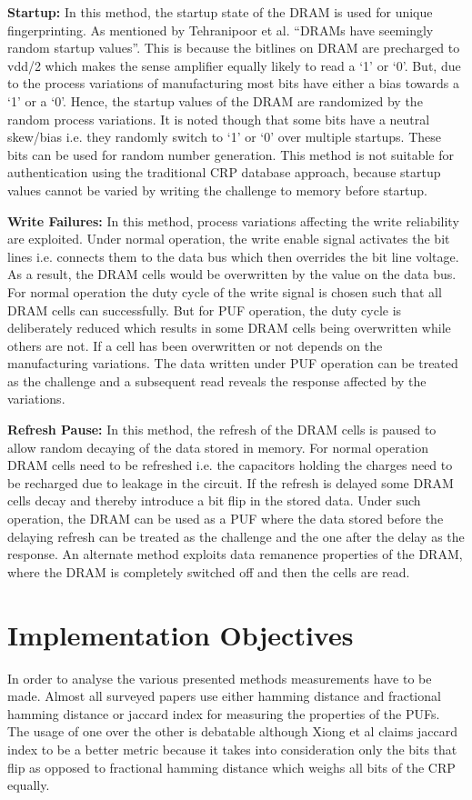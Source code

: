 \documentclass[journal, a4paper]{IEEEtran}
\begin{document}
\textbf{Startup:} In this method, the startup state of the DRAM is used for unique fingerprinting. As mentioned by Tehranipoor et al. “DRAMs have seemingly random startup values”. This is because the bitlines on DRAM are precharged to vdd/2 which makes the sense amplifier equally likely to read a ‘1’ or ‘0’. But, due to the process variations of manufacturing most bits have either a bias towards a ‘1’ or a ‘0’. Hence, the startup values of the DRAM are randomized by the random process variations. It is noted though that some bits have a neutral skew/bias i.e. they randomly switch to ‘1’ or ‘0’ over multiple startups. These bits can be used for random number generation. This method is not suitable for authentication using the traditional CRP database approach, because startup values cannot be varied by writing the challenge to memory before startup.\cite{TEH15}

\textbf{Write Failures:} In this method, process variations affecting the write reliability are exploited. Under normal operation, the write enable signal activates the bit lines i.e. connects them to the data bus which then overrides the bit line voltage. As a result, the DRAM cells would be overwritten by the value on the data bus. For normal operation the duty cycle of the write signal is chosen such that all DRAM cells can successfully. But for PUF operation, the duty cycle is deliberately reduced which results in some DRAM cells being overwritten while others are not. If a cell has been overwritten or not depends on the manufacturing variations. The data written under PUF operation can be treated as the challenge and a subsequent read reveals the response affected by the variations. \cite{HASH}

\textbf{Refresh Pause:} In this method, the refresh of the DRAM cells is paused to allow random decaying of the data stored in memory. \cite{SUT18} \cite{XIO16} \cite{SCH19} \cite{MISK} \cite{KELLER} For normal operation DRAM cells need to be refreshed i.e. the capacitors holding the charges need to be recharged due to leakage in the circuit. If the refresh is delayed some DRAM cells decay and thereby introduce a bit flip in the stored data. Under such operation, the DRAM can be used as a PUF where the data stored before the delaying refresh can be treated as the challenge and the one after the delay as the response. An alternate method exploits data remanence properties of the DRAM, where the DRAM is completely switched off and then the cells are read. \cite{REM}

\section{Implementation Objectives}
In order to analyse the various presented methods measurements have to be made. Almost all surveyed papers use either hamming distance and fractional hamming distance or jaccard index for measuring the properties of the PUFs.\cite{jaccard} The usage of one over the other is debatable although Xiong et al claims jaccard index to be a better metric because it takes into consideration only the bits that flip as opposed to fractional hamming distance which weighs all bits of the CRP equally. 
\end{document}
